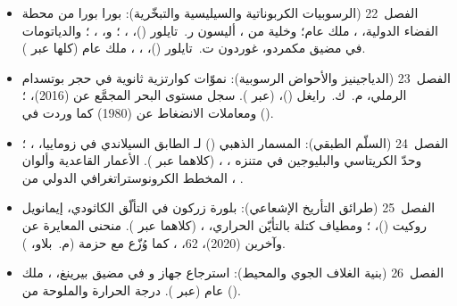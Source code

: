 \begin{itemize}
  \item الفصل~22 (الرسوبيات الكربوناتية والسيليسية والتبخّرية): بورا بورا من محطة الفضاء الدولية، ، ملك عام؛ وخلية من ، أليسون ر.~تايلور ()، ، ؛ و، ، ؛ والدياتومات في مضيق مكمردو، غوردون ت.~تايلور ()، ، ، ملك عام (كلها عبر ).
  \item الفصل~23 (الدياجينيز والأحواض الرسوبية): نموّات كوارتزية ثانوية في حجر بوتسدام الرملي، م.~ك.~رايغل ()،  (عبر ). سجل مستوى البحر المجمَّع عن  (2016)، ؛ ومعاملات الانضغاط عن  (1980) كما وردت في  ().
  \item الفصل~24 (السلّم الطبقي): المسمار الذهبي () لـ الطابق السيلاندي في زوماييا، ، ؛ وحدّ الكريتاسي والبليوجين في متنزه ، ،  (كلاهما عبر ). الأعمار القاعدية وألوان المخطط الكرونوستراتغرافي الدولي من ، .
  \item الفصل~25 (طرائق التأريخ الإشعاعي): بلورة زركون في التألّق الكاثودي، إيمانويل روكيت ()، ؛ ومطياف كتلة بالتأيّن الحراري، ،  (كلاهما عبر ). منحنى المعايرة  عن  وآخرين (2020)،  62، ، كما وُزّع مع حزمة  (م.~بلاو، ).
  \item الفصل~26 (بنية الغلاف الجوي والمحيط): استرجاع جهاز  و في مضيق بيرينغ، ، ملك عام (عبر ). درجة الحرارة والملوحة من  ().

\end{itemize}
